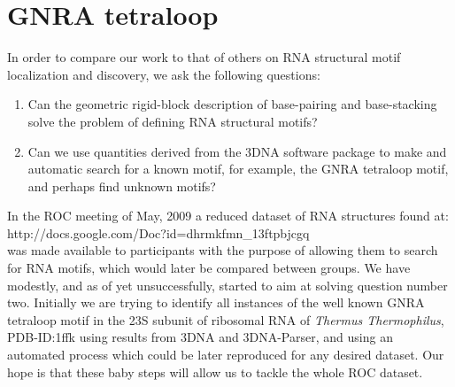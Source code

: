 \documentclass[10pt, oneside, pdftex]{article}
\begin{document}
\section{GNRA tetraloop}
In order to compare our work to that of others on RNA structural motif
localization and discovery, we ask the following questions:
\begin{enumerate}
\item{Can  the geometric rigid-block  description of  base-pairing and
  base-stacking solve the problem of defining RNA structural motifs?}
\item{Can we use quantities derived  from the 3DNA software package to
  make and automatic  search for a known motif,  for example, the GNRA
  tetraloop motif, and perhaps find unknown motifs?}
\end{enumerate}
In the  ROC meeting of May,  2009 a reduced dataset  of RNA structures
found  at:\\  http://docs.google.com/Doc?id=dhrmkfmn\_13ftpbjcgq\\ was
made available  to participants with  the purpose of allowing  them to
search for RNA motifs, which would later be compared between groups.
We  have modestly, and  as of  yet unsuccessfully,  started to  aim at
solving question number  two. Initially we are trying  to identify all
instances of the well known GNRA tetraloop motif in the 23S subunit of
ribosomal  RNA  of  \textit{Thermus Thermophilus},  PDB-ID:1ffk  using
results  from 3DNA  and 3DNA-Parser,  and using  an  automated process
which could be later reproduced  for any desired dataset.  Our hope is
that  these baby  steps  will allow  us to  tackle  the whole  ROC
dataset.
\end{document}
